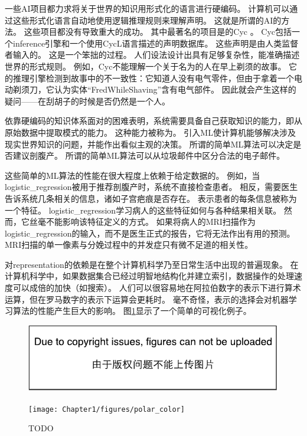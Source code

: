 一些\gls{AI}项目都力求将关于世界的知识用形式化的语言进行硬编码。
计算机可以通过这些形式化语言自动地使用逻辑推理规则来理解声明。
这就是所谓的\gls{AI}的方法。
这些项目都没有导致重大的成功。
其中最著名的项目是的Cyc \citep{Lenat-1989-book}。
Cyc包括一个\gls{inference}引擎和一个使用CycL语言描述的声明数据库。
这些声明是由人类监督者输入的。
这是一个笨拙的过程。
人们设法设计出具有足够复杂性，能准确描述世界的形式规则。
例如，Cyc不能理解一个关于名为的人在早上剃须的故事\citep{MachineChangedWorld}。
它的推理引擎检测到故事中的不一致性：它知道人没有电气零件，但由于拿着一个电动剃须刀，它认为实体``FredWhileShaving''含有电气部件。
因此就会产生这样的疑问——在刮胡子的时候是否仍然是一个人。

依靠硬编码的知识体系面对的困难表明，系统需要具备自己获取知识的能力，即从原始数据中提取模式的能力。
这种能力被称为。
引入\gls{ML}使计算机能够解决涉及现实世界知识的问题，并能作出看似主观的决策。
所谓的简单\gls{ML}算法可以决定是否建议剖腹产\citep{MorYosef90}。
所谓的简单\gls{ML}算法可以从垃圾邮件中区分合法的电子邮件。


这些简单的\gls{ML}算法的性能在很大程度上依赖于给定数据的。
例如，当\gls{logistic_regression}被用于推荐剖腹产时，系统不直接检查患者。
相反，需要医生告诉系统几条相关的信息，诸如子宫疤痕是否存在。
表示患者的每条信息被称为一个特征。
\gls{logistic_regression}学习病人的这些特征如何与各种结果相关联。
然而，它丝毫不能影响该特征定义的方式。
如果将病人的MRI扫描作为\gls{logistic_regression}的输入，而不是医生正式的报告，它将无法作出有用的预测。
MRI扫描的单一像素与分娩过程中的并发症只有微不足道的相关性。

对\gls{representation}的依赖是在整个计算机科学乃至日常生活中出现的普遍现象。
在计算机科学中，如果数据集合已经过明智地结构化并建立索引，数据操作的处理速度可以成倍的加快（如搜索）。
人们可以很容易地在阿拉伯数字的表示下进行算术运算，但在罗马数字的表示下运算会更耗时。
毫不奇怪，表示的选择会对机器学习算法的性能产生巨大的影响。
图\ref{fig:chap1_polar}显示了一个简单的可视化例子。
\begin{figure}[!htb]
\ifOpenSource
\centerline{\includegraphics{figure.pdf}}
\else
\centerline{\texttt{[image: Chapter1/figures/polar\_color]}}
\fi
\caption{TODO}
\label{fig:chap1_polar}
\end{figure}

